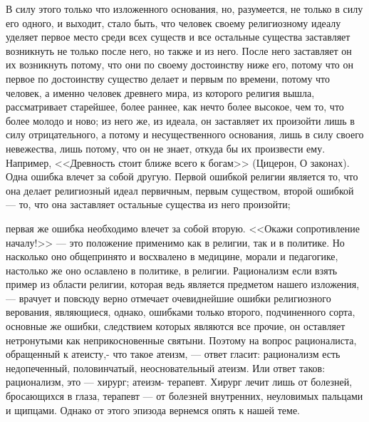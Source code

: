 \documentclass[12pt]{article}
\begin{document}
В силу этого только что изложенного основания, но, разумеется, не только в силу его одного, и выходит, стало быть, что человек своему религиозному идеалу уделяет первое место среди всех существ и все остальные существа заставляет возникнуть не только после него, но также и из него. После него заставляет он их возникнуть потому, что они по своему достоинству ниже его, потому что он первое по достоинству существо делает и первым по времени, потому что человек, а именно человек древнего мира, из которого религия вышла, рассматривает старейшее, более раннее, как нечто более высокое, чем то, что более молодо и ново; из него же, из идеала, он заставляет их произойти лишь в силу отрицательного, а потому и несущественного основания, лишь в силу своего невежества, лишь потому, что он не знает, откуда бы их произвести ему. Например, <<Древность стоит ближе всего к богам>> (Цицерон, О законах). Одна ошибка влечет за собой другую. Первой ошибкой религии является то, что она делает религиозный идеал первичным, первым существом, второй ошибкой --- то, что она заставляет остальные существа из него произойти; 

первая же ошибка необходимо влечет за собой вторую. <<Окажи сопротивление началу!>> --- это положение применимо как в религии, так и в политике. Но насколько оно общепринято и восхвалено в медицине, морали и педагогике, настолько же оно ославлено в политике, в религии. Рационализм если взять пример из области религии, которая ведь является предметом нашего изложения, --- врачует и повсюду верно отмечает очевиднейшие ошибки религиозного верования, являющиеся, однако, ошибками только второго, подчиненного сорта, основные же ошибки, следствием которых являются все прочие, он оставляет нетронутыми как неприкосновенные святыни. Поэтому на вопрос рационалиста, обращенный к атеисту,- что такое атеизм, --- ответ гласит: рационализм есть недопеченный, половинчатый, неосновательный атеизм. Или ответ таков: рационализм, это --- хирург; атеизм- терапевт. Хирург лечит лишь от болезней, бросающихся в глаза, терапевт --- от болезней внутренних, неуловимых пальцами и щипцами. Однако от этого эпизода вернемся опять к нашей теме. 
\end{document}
